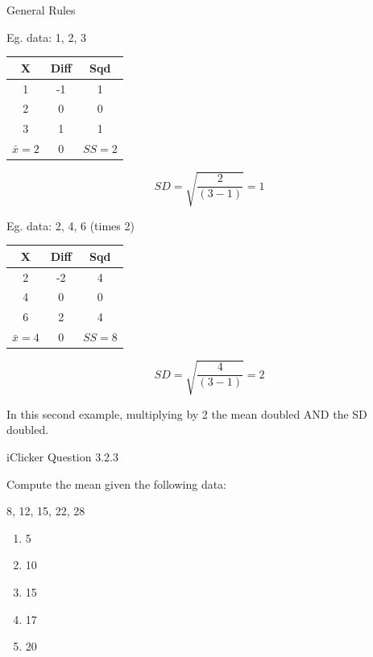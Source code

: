 \documentclass[14pt]{beamer}\usepackage[]{graphicx}\usepackage[]{color}
\begin{document}
\begin{frame}[fragile]{General Rules}

\begin{minipage}[ht]{5cm}

{\small{
Eg. data: 1, 2, 3

\begin{tabular}{@{} ccc @{}} \hline
X & Diff & Sqd \\ \hline
1 & -1 & 1 \\
2 & 0 & 0 \\
3 & 1 & 1 \\ \hline
$\bar{x}=2$ & 0 & $SS=2$ \\ \hline
\end{tabular}

\begin{equation*}
SD = \sqrt{ \frac{2}{(3-1)}} = 1
\end{equation*}
}}
\end{minipage}
\begin{minipage}[ht]{5cm}
{\small{
Eg. data: 2, 4, 6 (times 2)

\begin{tabular}{@{} ccc @{}} \hline
X & Diff & Sqd \\ \hline
2 & -2 & 4 \\
4 & 0 & 0 \\
6 & 2 & 4 \\ \hline
$\bar{x}=4$ & 0 & $SS=8$ \\ \hline
\end{tabular}

\begin{equation*}
SD = \sqrt{ \frac{4}{(3-1)}} = 2
\end{equation*}
}}
\end{minipage}

In this second example, multiplying by 2 the mean doubled AND the SD doubled.

\end{frame}

\begin{frame}[fragile]{iClicker Question 3.2.3}

Compute the mean given the following data:

8, 12, 15, 22, 28

\begin{enumerate}
\item 5
\item 10
\item 15
\item 17
\item 20
\end{enumerate}
\end{frame}
\end{document}
